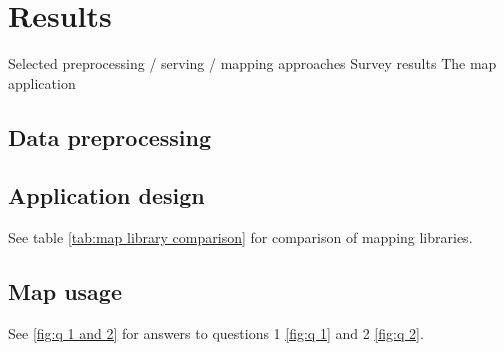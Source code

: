 \section{Results}
Selected preprocessing / serving / mapping approaches
Survey results
The map application

\subsection{Data preprocessing}

\subsection{Application design}

See table \ref{tab:map library comparison} for comparison of mapping libraries.





\subsection{Map usage}

See \ref{fig:q 1 and 2} for answers to questions 1 \ref{fig:q 1} and 2 \ref{fig:q 2}.

